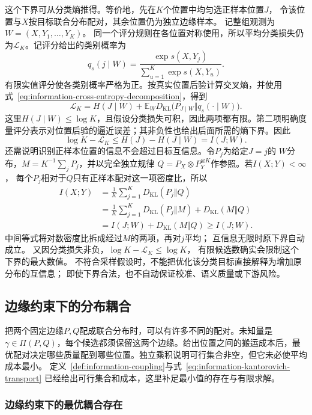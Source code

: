 这个下界可从分类熵推得。等价地，先在\(K\)个位置中均匀选正样本位置\(J\)，
令该位置与\(X\)按目标联合分布配对，其余位置仍为独立边缘样本。
记整组观测为\(W=(X,Y_1,\ldots,Y_K)\)。
同一个评分规则在各位置对称使用，所以平均分类损失仍为\(\mathcal L_K\)。记评分给出的类别概率为
\[
 q_s(j\mid W)=\frac{\exp s(X,Y_j)}{\sum_{u=1}^K\exp s(X,Y_u)}.
\]
有限实值评分使各类别概率严格为正。按真实位置后验计算交叉熵，并使用式~\eqref{eq:information-cross-entropy-decomposition}，得到
\[
 \mathcal L_K=H(J\mid W)+\mathbb E_W D_{\mathrm{KL}}\bigl(P_{J\mid W}\Vert q_s(\cdot\mid W)\bigr).
\]
这里\(H(J\mid W)\leq\log K\)，且假设分类损失可积，因此两项都有限。第二项明确度量评分表示对位置后验的逼近误差；其非负性也给出后面所需的熵下界。因此
\[
 \log K-\mathcal L_K\leq H(J)-H(J\mid W)=I(J;W).
\]
还需说明识别正样本位置的信息不会超过目标互信息。令\(P_j\)为给定\(J=j\)的
\(W\)分布，\(M=K^{-1}\sum_jP_j\)，并以完全独立规律
\(Q=P_X\otimes P_Y^{\otimes K}\)作参照。若\(I(X;Y)<\infty\)，
每个\(P_j\)相对于\(Q\)只有正样本配对这一项密度比，所以
\[
\begin{aligned}
 I(X;Y)&=\frac1K\sum_{j=1}^KD_{\mathrm{KL}}(P_j\Vert Q)\\
 &=\frac1K\sum_{j=1}^KD_{\mathrm{KL}}(P_j\Vert M)
      +D_{\mathrm{KL}}(M\Vert Q)\\
 &=I(J;W)+D_{\mathrm{KL}}(M\Vert Q)\geq I(J;W).
\end{aligned}
\]
中间等式将对数密度比拆成经过\(M\)的两项，再对\(j\)平均；
互信息无限时原下界自动成立。
又因分类损失非负，\(\log K-\mathcal L_K\leq\log K\)，
有限候选数确实会限制这个下界的最大数值。
不符合采样假设时，不能把优化该分类目标直接解释为增加原分布的互信息；
即使下界合法，也不自动保证校准、语义质量或下游风险。

\subsection{边缘约束下的分布耦合}
\label{sec:information-coupling-optimization}

把两个固定边缘\(P,Q\)配成联合分布时，可以有许多不同的配对。未知量是
\(\gamma\in\Pi(P,Q)\)，每个候选都须保留这两个边缘。给出位置之间的搬运成本后，最优配对决定哪些质量配到哪些位置。独立乘积说明可行集合非空，但它未必使平均成本最小。
定义~\ref{def:information-coupling}与式~\eqref{eq:information-kantorovich-transport}
已经给出可行集合和成本，这里补足最小值的存在与有限求解。

\subsubsection{边缘约束下的最优耦合存在}
\label{sec:information-optimal-coupling-existence}


